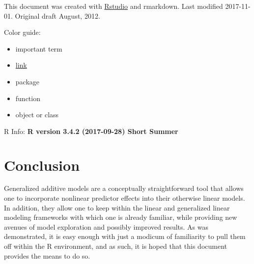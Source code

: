 \documentclass[]{tufte-book}
\providecommand{\tightlist}{%
  \setlength{\itemsep}{0pt}\setlength{\parskip}{0pt}}
\begin{document}
This document was created with \href{http://rstudio.org/}{Rstudio} and
rmarkdown. {Last modified 2017-11-01. Original draft August, 2012.}

\cite{Betebenner:2009}

Color guide:

\begin{itemize}
\tightlist
\item
  {important term}
\item
  \href{}{link}
\item
  {package}
\item
  {function}
\item
  {object or class}
\end{itemize}

R Info: \textbf{R version 3.4.2 (2017-09-28) Short Summer}

\chapter{Conclusion}\label{conclusion}

Generalized additive models are a conceptually straightforward tool that
allows one to incorporate nonlinear predictor effects into their
otherwise linear models. In addition, they allow one to keep within the
linear and generalized linear modeling frameworks with which one is
already familiar, while providing new avenues of model exploration and
possibly improved results. As was demonstrated, it is easy enough with
just a modicum of familiarity to pull them off within the R environment,
and as such, it is hoped that this document provides the means to do so.

\renewcommand\bibname{References}

\end{document}
